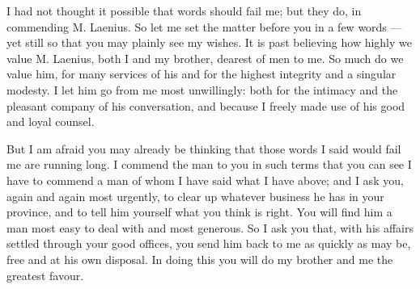 

 I had not thought it possible that words should fail me; but they do, in commending M. Laenius. So let me set the matter before you in a few words --- yet still so that you may plainly see my wishes. It is past believing how highly we value M. Laenius, both I and my brother, dearest of men to me. So much do we value him, for many services of his and for the highest integrity and a singular modesty. I let him go from me most unwillingly: both for the intimacy and the pleasant company of his conversation, and because I freely made use of his good and loyal counsel.

 But I am afraid you may already be thinking that those words I said would fail me are running long. I commend the man to you in such terms that you can see I have to commend a man of whom I have said what I have above; and I ask you, again and again most urgently, to clear up whatever business he has in your province, and to tell him yourself what you think is right. You will find him a man most easy to deal with and most generous. So I ask you that, with his affairs settled through your good offices, you send him back to me as quickly as may be, free and at his own disposal. In doing this you will do my brother and me the greatest favour.
